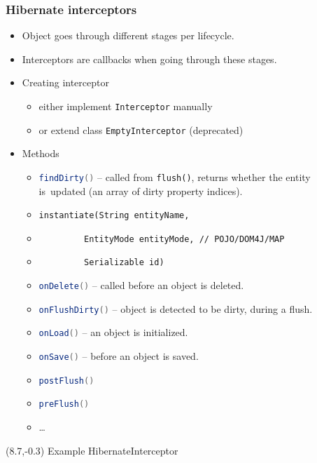 \documentclass[10pt,xcolor=pdflatex]{beamer}
\newcommand{\inlinejava}{\lstinline[language={Java}]}
\begin{document}
\begin{frame}[fragile]\frametitle{Hibernate interceptors}
	\begin{itemize}
		\item Object goes through different stages per lifecycle.
		\item Interceptors are callbacks when going through these stages.
		\item Creating interceptor
          \begin{itemize}
        	\item either implement \texttt{Interceptor} manually
        	\item or extend class \inlinejava{EmptyInterceptor} (deprecated)
          \end{itemize}
        \smallskip
		\item Methods
          \begin{itemize}
        	\item \inlinejava{findDirty()} -- {\footnotesize called from \texttt{flush()}, returns whether the entity is~updated (an array of dirty property indices)}.
        	\item \verb+instantiate(String entityName,+
            \item[] \verb+         EntityMode entityMode, // POJO/DOM4J/MAP+
            \item[] \verb+         Serializable id)+
        	\item \inlinejava{onDelete()} -- {\footnotesize called before an object is deleted.}
        	\item \inlinejava{onFlushDirty()} -- {\footnotesize object is detected to be dirty, during a flush.}
        	\item \inlinejava{onLoad()} -- {\footnotesize an object is initialized.}
        	\item \inlinejava{onSave()} -- {\footnotesize before an object is saved.}
        	\item \inlinejava{postFlush()}
        	\item \inlinejava{preFlush()}
            \item \ldots
          \end{itemize}
		\normalsize
	\end{itemize}
\begin{textblock}{15}(8.7,-0.3)
    {\footnotesize Example HibernateInterceptor}
\end{textblock}
\end{frame}
\end{document}
